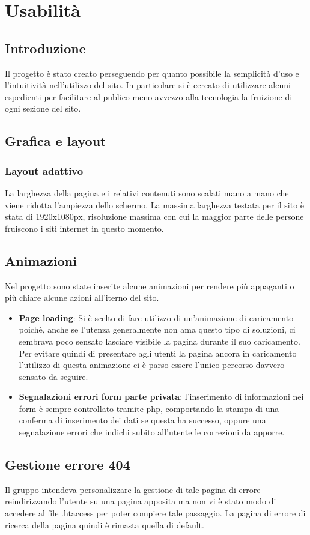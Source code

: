 \documentclass[a4paper,12pt]{article}
\begin{document}
\section{Usabilità}
\subsection{Introduzione}
Il progetto è stato creato perseguendo per quanto possibile la semplicità d'uso e l'intuitività nell'utilizzo del sito. In particolare si è cercato di utilizzare alcuni espedienti per facilitare al publico meno avvezzo alla tecnologia la fruizione di ogni sezione del sito.
\subsection{Grafica e layout}
\subsubsection{Layout adattivo}
La larghezza della pagina e i relativi contenuti sono scalati mano a mano che viene ridotta l'ampiezza dello schermo. La massima larghezza testata per il sito è stata di 1920x1080px, risoluzione massima con cui la maggior parte delle persone fruiscono i siti internet in questo momento.
\subsection{Animazioni}
Nel progetto sono state inserite alcune animazioni per rendere più appaganti o più chiare alcune azioni all'iterno del sito.
\begin{itemize}
	\item \textbf{Page loading}: Si è scelto di fare utilizzo di un'animazione di caricamento poichè, anche se l'utenza generalmente non ama questo tipo di soluzioni, ci sembrava poco sensato lasciare visibile la pagina durante il suo caricamento. Per evitare quindi di presentare agli utenti la pagina ancora in caricamento l'utilizzo di questa animazione ci è parso essere l'unico percorso davvero sensato da seguire.
	
	\item \textbf{Segnalazioni errori form parte privata}: l'inserimento di informazioni nei form è sempre controllato tramite php, comportando la stampa di una conferma di inserimento dei dati se questa ha successo, oppure una segnalazione errori che indichi subito all'utente le correzioni da apporre.
\end{itemize}
\subsection{Gestione errore 404}
Il gruppo intendeva personalizzare la gestione di tale pagina di errore reindirizzando l'utente su una pagina apposita ma non vi è stato modo di accedere al file .htaccess per poter compiere tale passaggio. La pagina di errore di ricerca della pagina quindi è rimasta quella di default.
\end{document}
